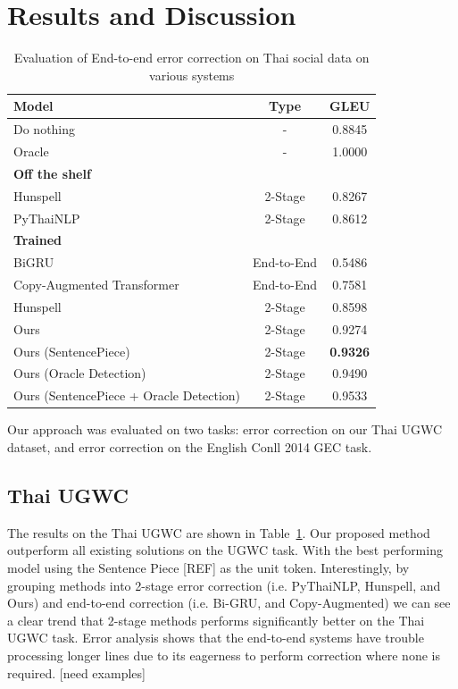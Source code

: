 
\section{Results and Discussion}

\begin{table}
  \caption{Evaluation of End-to-end error correction on Thai social data on various systems}
  \begin{tabular}{lcc}
    \toprule
    Model & Type & GLEU \\
    \midrule
    Do nothing & - & 0.8845 \\
    Oracle & - & 1.0000 \\
    \midrule
    \textbf{Off the shelf} & \\
    Hunspell & 2-Stage & 0.8267 \\
    PyThaiNLP & 2-Stage & 0.8612 \\
    \midrule
    \textbf{Trained} & \\
    BiGRU & End-to-End & 0.5486 \\
    Copy-Augmented Transformer & End-to-End & 0.7581 \\
    Hunspell & 2-Stage & 0.8598 \\
    \midrule
    Ours & 2-Stage & 0.9274 \\
    Ours (SentencePiece) & 2-Stage & \textbf{0.9326} \\
    Ours (Oracle Detection) & 2-Stage & 0.9490 \\
    Ours (SentencePiece + Oracle Detection) & 2-Stage & 0.9533 \\
    \bottomrule
  \end{tabular}
  \label{tab:e2e_ugwc}
\end{table}

Our approach was evaluated on two tasks: error correction on our Thai UGWC dataset, and error correction on the English Conll 2014 GEC task.

\subsection{Thai UGWC}

The results on the Thai UGWC are shown in Table~\ref{tab:e2e_ugwc}. Our proposed method outperform all existing solutions on the UGWC task. With the best performing model using the Sentence Piece [REF] as the unit token. Interestingly, by grouping methods into 2-stage error correction (i.e. PyThaiNLP, Hunspell, and Ours) and end-to-end correction (i.e. Bi-GRU, and Copy-Augmented) we can see a clear trend that 2-stage methods performs significantly better on the Thai UGWC task. Error analysis shows that the end-to-end systems have trouble processing longer lines due to its eagerness to perform correction where none is required. [need examples]

